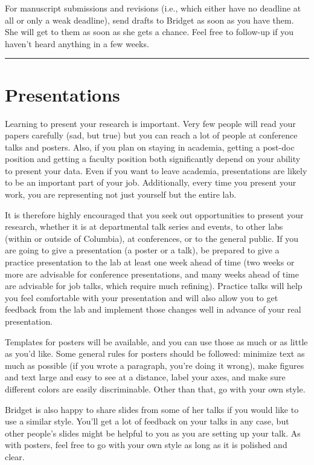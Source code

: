 \documentclass[]{book}
\begin{document}
For manuscript submissions and revisions (i.e., which either have no deadline at all or only a weak deadline), send drafts to Bridget as soon as you have them. She will get to them as soon as she gets a chance. Feel free to follow-up if you haven't heard anything in a few weeks.

\begin{center}\rule{0.5\linewidth}{\linethickness}\end{center}

\hypertarget{presentations}{%
\section{Presentations}\label{presentations}}

Learning to present your research is important. Very few people will read your papers carefully (sad, but true) but you can reach a lot of people at conference talks and posters. Also, if you plan on staying in academia, getting a post-doc position and getting a faculty position both significantly depend on your ability to present your data. Even if you want to leave academia, presentations are likely to be an important part of your job. Additionally, every time you present your work, you are representing not just yourself but the entire lab.

It is therefore highly encouraged that you seek out opportunities to present your research, whether it is at departmental talk series and events, to other labs (within or outside of Columbia), at conferences, or to the general public. If you are going to give a presentation (a poster or a talk), be prepared to give a practice presentation to the lab at least one week ahead of time (two weeks or more are advisable for conference presentations, and many weeks ahead of time are advisable for job talks, which require much refining). Practice talks will help you feel comfortable with your presentation and will also allow you to get feedback from the lab and implement those changes well in advance of your real presentation.

Templates for posters will be available, and you can use those as much or as little as you'd like. Some general rules for posters should be followed: minimize text as much as possible (if you wrote a paragraph, you're doing it wrong), make figures and text large and easy to see at a distance, label your axes, and make sure different colors are easily discriminable. Other than that, go with your own style.

Bridget is also happy to share slides from some of her talks if you would like to use a similar style. You'll get a lot of feedback on your talks in any case, but other people's slides might be helpful to you as you are setting up your talk. As with posters, feel free to go with your own style as long as it is polished and clear.
\end{document}

